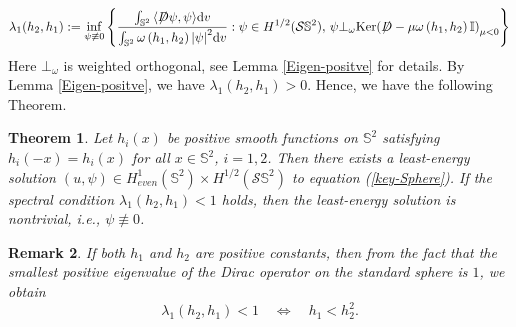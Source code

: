 \documentclass[a4paper, 12pt]{article}
\newtheorem{theorem}{Theorem}[section]
\newtheorem{remark}[theorem]{Remark}
\def\slashiii#1{\setbox0=\hbox{$#1$}#1\hskip-\wd0\hbox to\wd0{\hss\sl/\/\hss}}
\begin{document}
\[{\lambda _1}({h_2},{h_1}): = \mathop {\inf }\limits_{\psi \not  \equiv 0} \left\{ {\frac{{\int_{{\mathbb{S}^2}} {\left\langle {\slashiii{D}\psi ,\psi } \right\rangle } {\text{d}}v}}{{\int_{{\mathbb{S}^2}} {\omega \left( {{h_1},{h_2}} \right){{\left| \psi  \right|}^2}{\text{d}}v} }}:\psi  \in {H^{1/2}}(\mathcal{S}{\mathbb{S}^2}),\, \psi { \bot _\omega }{\text{Ker}}{{(\slashiii{D} - \mu \omega \left( {{h_1},{h_2}} \right)\mathbb{I})}_{\mu  < 0}}} \right\}\]
Here \(\bot _\omega\) is weighted orthogonal, see Lemma \ref{Eigen-positve} for details. By Lemma \ref{Eigen-positve}, we have \(\lambda_1(h_2, h_1)  > 0\). Hence, we have the following Theorem.
\begin{theorem}\label{main-Thm}
	Let $h_i(x) $ be positive smooth functions on $\mathbb{S}^2$ satisfying $
	h_i(-x) = h_i(x)$ for all $x\in \mathbb{S}^2$, $i=1,2$. Then there exists a least-energy solution \((u, \psi) \in H_{even}^1(\mathbb{S}^2)\times H^{1/2}( \mathcal{S}\mathbb{S}^2 )\) to equation (\ref{key-Sphere}). If the spectral condition \(\lambda_1(h_2, h_1) < 1\) holds, then the least-energy solution is nontrivial, i.e., \(\psi \not\equiv 0\).
\end{theorem}
\begin{remark}
	If both \(h_1\) and \(h_2\) are positive constants, then from the fact that the smallest positive eigenvalue of the Dirac operator on the standard sphere is \(1\), we obtain
	\[
	\lambda_1(h_2, h_1) < 1 \quad \Leftrightarrow \quad h_1 < h_2^2.
	\]
\end{remark}
\end{document}
